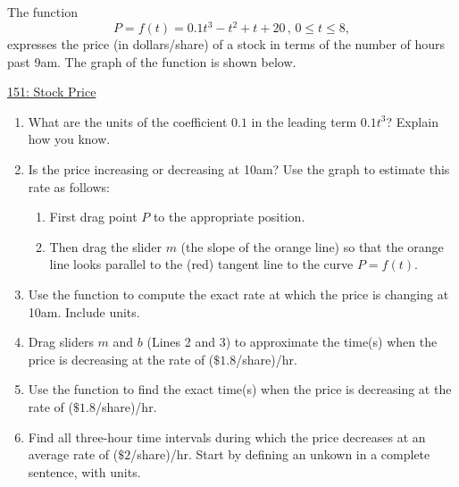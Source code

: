 \documentclass{ximera}
\begin{document}
\begin{question}  \label{Qkkdg777}
The function
\[
      P = f(t) = 0.1t^3-t^2+t+20 \, , \, 0\leq t \leq 8 ,
\]
expresses the price (in dollars/share) of a stock in terms of the number of hours past 9am. The graph of the function is shown below.

\begin{onlineOnly}
    \begin{center}
\end{center}
\end{onlineOnly}

\href{https://www.desmos.com/calculator/gpqicgxvk3}{151: Stock Price}

\begin{enumerate}
\item What are the units of the coefficient $0.1$ in the leading term $0.1t^3$? Explain how you know. 

\item Is the price increasing or decreasing at 10am? Use the graph to estimate this rate as follows:

\begin{enumerate}
\item First drag point $P$ to the appropriate position.

\item Then drag the slider $m$ (the slope of the orange line) so that the orange line looks parallel to the (red) tangent line to the curve $P=f(t)$.
\end{enumerate}

\item Use the function to compute the exact rate at which the price is changing at 10am. Include units.

\item Drag sliders $m$ and $b$ (Lines 2 and 3) to approximate the time(s) when the price is decreasing at the rate of ($\$1.8$/share)/hr.

\item Use the function to find the exact time(s) when the price is decreasing at the rate of ($\$1.8$/share)/hr.

\item Find all three-hour time intervals during which the price decreases at an average rate of ($\$2$/share)/hr. Start by defining an unkown in a complete sentence, with units.




\end{enumerate}
\end{question}
\end{document}
